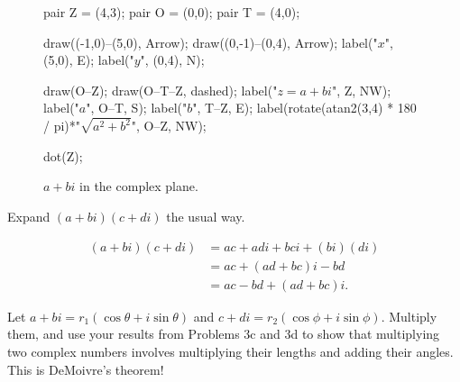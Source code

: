 \documentclass[../gatm_answers.tex]{subfiles}
\begin{document}
\begin{figure}[h]
	\begin{center}
		\begin{minipage}{\textwidth}
			\centering
			\begin{asy}[width=0.5\textwidth]
				pair Z = (4,3);
				pair O = (0,0);
				pair T = (4,0);
				
				draw((-1,0)--(5,0), Arrow);
				draw((0,-1)--(0,4), Arrow);
				label("$x$", (5,0), E);
				label("$y$", (0,4), N);
				
				draw(O--Z);
				draw(O--T--Z, dashed);
				label("$z=a+bi$", Z, NW);
				label("$a$", O--T, S);
				label("$b$", T--Z, E);
				label(rotate(atan2(3,4) * 180 / pi)*"$\sqrt{a^2+b^2}$", O--Z, NW);
				
				dot(Z);
			\end{asy}
		\end{minipage}
	\end{center}

	\begin{center}
		\begin{minipage}{\textwidth}
			\caption{$a+bi$ in the complex plane.}
			\label{fig:a_plus_b_i}
		\end{minipage}
	\end{center}
	\vspace*{-2\baselineskip}
\end{figure}

\begin{inner_problem}
\item Expand $(a+bi)(c+di)$ the usual way.
\end{inner_problem}

\begin{align*}
(a+bi)(c+di)&=ac+adi+bci+(bi)(di) \\
&= ac + (ad + bc)i - bd \\
&= ac - bd + (ad + bc)i.
\end{align*}

\begin{inner_problem}
\item Let $a+bi=r_1(\cos\theta + i\sin\theta)$ and $c+di=r_2(\cos\phi + i\sin\phi)$. Multiply them, and use your results from Problems 3c and 3d to show that multiplying two complex numbers involves multiplying their lengths and adding their angles. This is DeMoivre's theorem!
\end{inner_problem}

\end{document}
